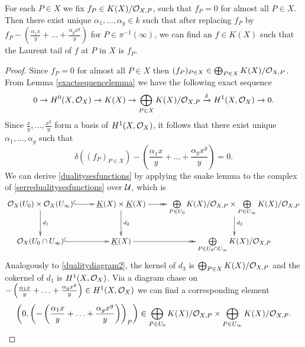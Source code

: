 
    \begin{cor}
    For each $P \in X$ we fix $f_P \in K(X)/{\cal O}_{X,P}$, such that $f_P = 0$ for almost all $P \in X$.
    Then there exist unique $\alpha_1, \ldots, \alpha_g \in k$ such that after replacing $f_P$ by $f_P - \left( \frac{\alpha_1 x}{y} + \ldots + \frac{\alpha_g x^g}{y}\right)$ for $P \in \pi^{-1}(\infty)$, we can find an $f \in K(X)$ such that the Laurent tail of $f$ at $P$ in $X$ is $f_P$.
    \end{cor}
    \begin{proof}
    Since $f_P = 0$ for almost all $P \in X$ then $(f_P)_{P \in X} \in \bigoplus_{P \in X} K(X)/{\cal O}_{X,P}$.
    From Lemma \ref{exactsequencelemma} we have the following exact sequence
        \begin{equation*}
        0 \rightarrow H^0(X,{\cal O}_X) \rightarrow K(X) \rightarrow \bigoplus_{P \in X} K(X)/{\cal O}_{X,P} \xrightarrow{\delta} H^1(X,\mathcal{O}_X) \rightarrow 0.
        \end{equation*}
    Since $\frac{x}{y}, \ldots, \frac{x^g}{y}$ form a basis of $H^1(X,\mathcal{O}_X)$, it follows that there exist unique $\alpha_1, \ldots, \alpha_g$ such that
        \[
        \delta\left( (f_P)_{P \in X} \right) - \left( \frac{\alpha_1 x}{y} + \ldots + \frac{\alpha_g x^g}{y}\right) = 0.
        \]
    We can derive \eqref{dualitysesfunctions} by applying the snake lemma to the \cech complex of \eqref{serredualitysesfunctions} over ${\mathcal U}$, which is
        \begin{equation}
        \xymatrix{\cO_X(U_0)\times\cO_X(U_\infty) \ar@{^{(}->}[r] \ar[d]^{d_1} & \underline{K}(X) \times \underline{K}(X) \ar[d]^{d_2} \ar@{->>}[r] & \bigoplus \limits_{P \in U_0} K(X)/\cO_{X,P} \times \bigoplus \limits_{P \in U_\infty} K(X)/\cO_{X,P} \ar[d]^{d_3} \\
        \cO_X(U_0 \cap U_\infty) \ar@{^{(}->}[r]  & \underline{K}(X) \ar@{->>}[r] & \bigoplus \limits_{P\in U_0 \cap U_\infty} K(X)/\cO_{X,P} }
        \end{equation}
    Analogously to \eqref{dualitydiagram2}, the kernel of $d_3$ is $\bigoplus_{P \in X}K(X)/{\cal O}_{X,P}$ and the cokernel of $d_1$ is $H^1(X,\mathcal{O}_X)$.
    Via a diagram chase on $- \left( \frac{\alpha_1 x}{y} + \ldots + \frac{\alpha_g x^g}{y}\right) \in H^1(X,\mathcal{O}_X)$ we can find a corresponding element 
        \begin{equation}\label{immediate}
        \left(0, \left(- \left( \frac{\alpha_1 x}{y} + \ldots + \frac{\alpha_g x^g}{y}\right) \right)_P\right) \in \bigoplus_{P \in U_0}K(X)/\cO_{X,P} \times \bigoplus_{P \in U_\infty}K(X)/\cO_{X,P}.

\end{equation}
\end{proof}
